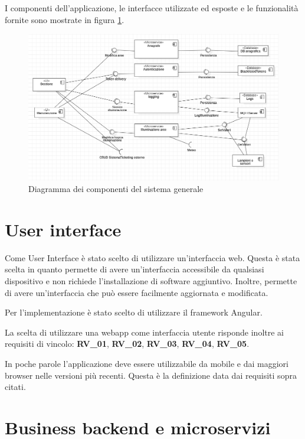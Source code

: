 I componenti dell'applicazione, le interfacce utilizzate ed esposte e le funzionalità fornite sono mostrate in figura \ref{fig:high-level-diagram}.

\begin{figure}[ht]
    \centering
    \includegraphics[width=\textwidth]{img/high-level-diagram.png}
    \caption{Diagramma dei componenti del sistema generale}
    \label{fig:high-level-diagram}
\end{figure}


\section{User interface}

Come User Interface è stato scelto di utilizzare un'interfaccia web. Questa è stata scelta in quanto permette di avere un'interfaccia accessibile da qualsiasi dispositivo e non richiede l'installazione di software aggiuntivo. Inoltre, permette di avere un'interfaccia che può essere facilmente aggiornata e modificata.

Per l'implementazione è stato scelto di utilizzare il framework Angular.

La scelta di utilizzare una webapp come interfaccia utente risponde inoltre ai requisiti di vincolo: \textbf{RV\_01}, \textbf{RV\_02}, \textbf{RV\_03}, \textbf{RV\_04}, \textbf{RV\_05}.

In poche parole l'applicazione deve essere utilizzabile da mobile e dai maggiori browser nelle versioni più recenti. Questa è la definizione data dai requisiti sopra citati.

\section{Business backend e microservizi}

